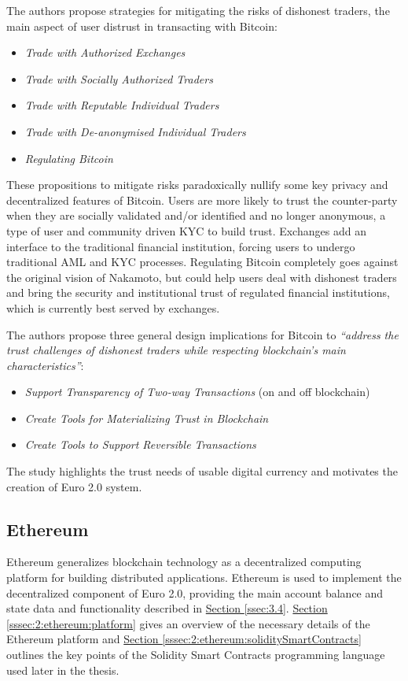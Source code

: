 \documentclass[a4paper,12pt]{article} %
\newcommand{\hypersectionref}[1]{\hyperref[#1]{Section \ref{#1}}}
\begin{document}
The authors propose strategies for mitigating the risks of dishonest traders, the main aspect of user distrust in transacting with Bitcoin:
\begin{itemize}
	\item \textit{Trade with Authorized Exchanges}
	\item \textit{Trade with Socially Authorized Traders}
	\item \textit{Trade with Reputable Individual Traders}
	\item \textit{Trade with De-anonymised Individual Traders}
	\item \textit{Regulating Bitcoin}
\end{itemize}
These propositions to mitigate risks paradoxically nullify some key privacy and decentralized features of Bitcoin. Users are more likely to trust the counter-party when they are socially validated and/or identified and no longer anonymous, a type of user and community driven KYC to build trust. Exchanges add an interface to the traditional financial institution, forcing users to undergo traditional AML and KYC processes. Regulating Bitcoin completely goes against the original vision of Nakamoto, but could help users deal with dishonest traders and bring the security and institutional trust of regulated financial institutions, which is currently best served by exchanges.

The authors propose three general design implications for Bitcoin to \textit{``address the trust challenges of dishonest traders while respecting blockchain's main characteristics''}\cite{sas2016design}:
\begin{itemize}
	\item \textit{Support Transparency of Two-way Transactions} (on and off blockchain)
	\item \textit{Create Tools for Materializing Trust in Blockchain}
	\item \textit{Create Tools to Support Reversible Transactions}
\end{itemize}

The study highlights the trust needs of usable digital currency and motivates the creation of Euro 2.0 system.

\subsection{Ethereum} \label{ssec:2:ethereum}

Ethereum generalizes blockchain technology as a decentralized computing platform for building distributed applications. Ethereum is used to implement the decentralized component of Euro 2.0, providing the main account balance and state data and functionality described in \hypersectionref{ssec:3.4}. \hypersectionref{sssec:2:ethereum:platform} gives an overview of the necessary details of the Ethereum platform and \hypersectionref{sssec:2:ethereum:soliditySmartContracts} outlines the key points of the Solidity Smart Contracts programming language used later in the thesis.
\end{document}
